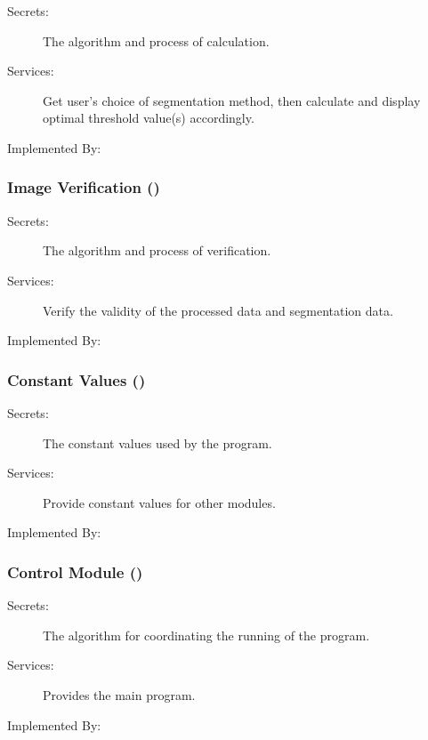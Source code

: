 \documentclass[12pt, titlepage]{article}
\begin{document}
\begin{description}
\item[Secrets:]The algorithm and process of calculation.
\item[Services:]Get user's choice of segmentation method, then calculate and
display optimal threshold value(s) accordingly.

\item[Implemented By:] \progname{}
\end{description}

\subsubsection{Image Verification ()}

\begin{description}
\item[Secrets:]The algorithm and process of verification.
\item[Services:]Verify the validity of the processed data and segmentation
data.\item[Implemented By:] \progname{}
\end{description}

\subsubsection{Constant Values ()}

\begin{description}
\item[Secrets:]The constant values used by the program.
\item[Services:]Provide constant values for other modules.
\item[Implemented By:] \progname{}
\end{description}

\subsubsection{Control Module ()}

\begin{description}
\item[Secrets:]The algorithm for coordinating the running of the program.
\item[Services:]Provides the main program.
\item[Implemented By:] \progname{}
\end{description}
\end{document}
